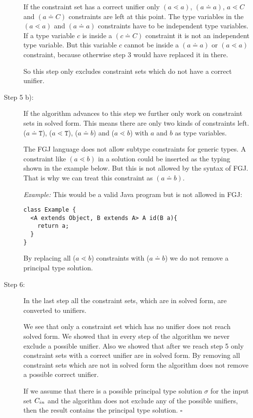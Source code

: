 \begin{description}
If the constraint set has a correct unifier only $(a \lessdot a)$, $(a \doteq a)$, $a \lessdot C$ and $(a \doteq C)$ constraints are left at this point.
The type variables in the $(a \lessdot a)$ and $(a \doteq a)$ constraints have to be independent type variables.
If a type variable $c$ is inside a $(c \doteq C)$ constraint it is not an independent type variable.
But this variable $c$ cannot be inside a $(a \doteq a)$ or $(a \lessdot a)$ constraint, because otherwise step 3 would have replaced it in there.

So this step only excludes constraint sets which do not have a correct unifier.

\item[Step 5 b):]
If the algorithm advances to this step we further only work on constraint sets in solved form.
This means there are only two kinds of constraints left.
($a \doteq \texttt{T}$), ($a \lessdot \texttt{T}$), ($a \doteq b$) and ($a \lessdot b$) with $a$ and $b$ as type variables.


The FGJ language does not allow subtype constraints for generic types.
A constraint like $(a \lessdot b)$ in a solution could be inserted as the typing shown in the example below.
But this is not allowed by the syntax of FGJ.
That is why we can treat this constraint as $(a \doteq b)$.


\textit{Example:}
This would be a valid Java program but is not allowed in FGJ:
\begin{lstlisting}
class Example {
  <A extends Object, B extends A> A id(B a){
    return a;
  }
}
\end{lstlisting}

By replacing all ($a \lessdot b$) constraints with ($a \doteq b$) we do not remove a principal type solution.

\item[Step 6:]
In the last step all the constraint sets, which are in solved form, are converted to unifiers.

We see that only a constraint set which has no unifier does not reach solved form.
We showed that in every step of the \unify{} algorithm we never exclude a possible unifier.
Also we showed that after we reach step 5 only constraint sets with a correct unifier are in solved form.
By removing all constraint sets which are not in solved form the algorithm does not
remove a possible correct unifier.

If we assume that there is a possible principal type solution $\sigma$ for the input set $C_{in}$
and the \unify{} algorithm does not exclude any of the possible unifiers,
then the result \unify{} contains the principal type solution.
\hfill $\square$
\end{description}

